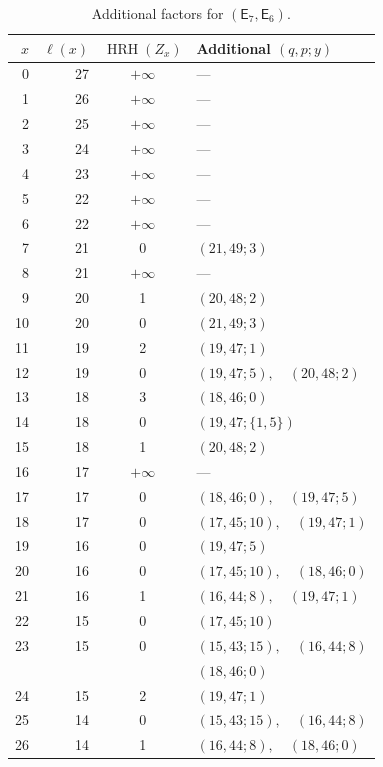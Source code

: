 \documentclass[12pt]{amsart}
\theoremstyle{definition}
\numberwithin{equation}{section}
\begin{document}
\begin{table}[!htbp]
\begin{minipage}{\textwidth}
\centering
\caption{Additional factors for $(\mathsf E_7,\mathsf E_6)$.}
\label{tab:exceptional-e7}
\medskip
{\small
\setlength{\tabcolsep}{3pt}
\begin{minipage}[t]{0.49\textwidth}
\vspace{0pt}\centering
\begin{tabular}{@{}rrcl@{}}
\hline
$x$ & $\ell(x)$ & $\operatorname{HRH}(Z_x)$ & Additional $(q,p;y)$\\
\hline
0 & 27 & $+\infty$ & ---\\
1 & 26 & $+\infty$ & ---\\
2 & 25 & $+\infty$ & ---\\
3 & 24 & $+\infty$ & ---\\
4 & 23 & $+\infty$ & ---\\
5 & 22 & $+\infty$ & ---\\
6 & 22 & $+\infty$ & ---\\
7 & 21 & 0 & $(21,49;3)$\\
8 & 21 & $+\infty$ & ---\\
9 & 20 & 1 & $(20,48;2)$\\
10 & 20 & 0 & $(21,49;3)$\\
11 & 19 & 2 & $(19,47;1)$\\
12 & 19 & 0 & $(19,47;5),\quad (20,48;2)$\\
13 & 18 & 3 & $(18,46;0)$\\
14 & 18 & 0 & $(19,47;\{1,5\})$\\
15 & 18 & 1 & $(20,48;2)$\\
16 & 17 & $+\infty$ & ---\\
17 & 17 & 0 & $(18,46;0),\quad (19,47;5)$\\
18 & 17 & 0 & $(17,45;10),\quad (19,47;1)$\\
19 & 16 & 0 & $(19,47;5)$\\
20 & 16 & 0 & $(17,45;10),\quad (18,46;0)$\\
21 & 16 & 1 & $(16,44;8),\quad (19,47;1)$\\
22 & 15 & 0 & $(17,45;10)$\\
23 & 15 & 0 & $(15,43;15),\quad (16,44;8)$\\
 & &  & $(18,46;0)$\\
24 & 15 & 2 & $(19,47;1)$\\
25 & 14 & 0 & $(15,43;15),\quad (16,44;8)$\\
26 & 14 & 1 & $(16,44;8),\quad (18,46;0)$\\

\end{tabular}
\end{minipage}}
\end{minipage}
\end{table}
\end{document}
